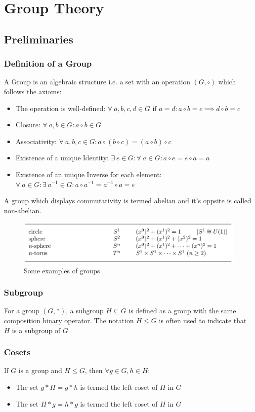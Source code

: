 \section{Group Theory}
\label{appendix_d}
\subsection{Preliminaries}
\subsubsection{Definition of a Group}
A Group is an algebraic structure i.e. a set with an operation $(G, \circ)$ which follows the axioms:
\begin{itemize}
    \item The operation is well-defined: $\forall \ a,b,c,d \in G \text{ if } a = d: a \circ b = c \implies d \circ b = c$
    \item Closure: $\forall \ a,b \in G: a \circ b \in G$
    \item Associativity: $\forall \ a,b,c \in G: a \circ (b \circ c) = (a \circ b) \circ c$	
    \item Existence of a unique Identity: $\exists \ e \in G : \forall \ a \in G: a \circ e = e \circ a =
    a$	
    \item Existence of an unique Inverse for each element: $\forall \ a \in G: \exists \  a^{-1} \in G: a \circ a^{-1} = a^{-1} \circ a = e$	
\end{itemize}
A group which displays commutativity is termed abelian and it's oppsite is called non-abelian.
\begin{figure}
	\centering
	\includegraphics[scale=0.5]{Figures/Groups.png}
	\caption{Some examples of groups}
\end{figure}

\subsubsection{Subgroup}
For a group $(G, *)$, a subgroup $H \subseteq G$ is defined as a group with the same composition binary operator. The notation $H \leq G$ is often used to indicate that $H$ is a subgroup of $G$

\subsubsection{Cosets}
If $G$ is a group and $H \leq G$, then $\forall g \in G, h \in H$:
\begin{itemize}
    \item The set $g*H = {g*h}$ is termed the left coset of $H$ in $G$
    \item The set $H*g = {h*g}$ is termed the left coset of $H$ in $G$
\end{itemize}
